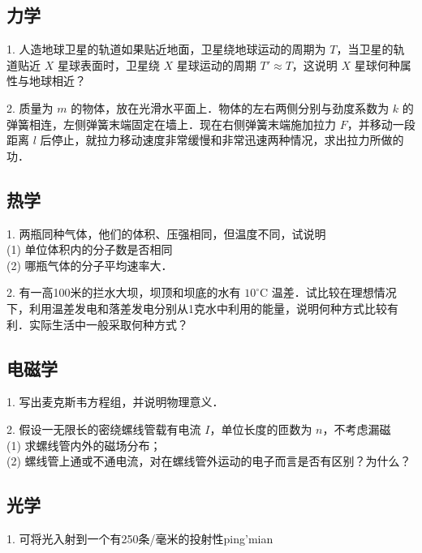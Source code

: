 \subsection{力学}
1. 人造地球卫星的轨道如果贴近地面，卫星绕地球运动的周期为 $T$，当卫星的轨道贴近 $X$ 星球表面时，卫星绕 $X$ 星球运动的周期 $T' \approx T$，这说明 $X$ 星球何种属性与地球相近？

2. 质量为 $m$ 的物体，放在光滑水平面上．物体的左右两侧分别与劲度系数为 $k$ 的弹簧相连，左侧弹簧末端固定在墙上．现在右侧弹簧末端施加拉力 $F$，并移动一段距离 $l$ 后停止，就拉力移动速度非常缓慢和非常迅速两种情况，求出拉力所做的功．
\subsection{热学}
1. 两瓶同种气体，他们的体积、压强相同，但温度不同，试说明\\
(1) 单位体积内的分子数是否相同\\
(2) 哪瓶气体的分子平均速率大．

2. 有一高100米的拦水大坝，坝顶和坝底的水有 $10^\circ\mathrm{C}$ 温差．试比较在理想情况下，利用温差发电和落差发电分别从1克水中利用的能量，说明何种方式比较有利．实际生活中一般采取何种方式？
\subsection{电磁学}
1. 写出麦克斯韦方程组，并说明物理意义．

2. 假设一无限长的密绕螺线管载有电流 $I$，单位长度的匝数为 $n$，不考虑漏磁\\
(1) 求螺线管内外的磁场分布；\\
(2) 螺线管上通或不通电流，对在螺线管外运动的电子而言是否有区别？为什么？
\subsection{光学}
1. 可将光入射到一个有250条/毫米的投射性ping'mian
